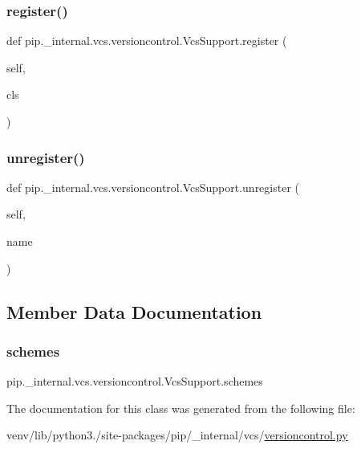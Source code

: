 \subsubsection{\texorpdfstring{register()}{register()}}
{\footnotesize\ttfamily def pip.\+\_\+internal.\+vcs.\+versioncontrol.\+Vcs\+Support.\+register (\begin{DoxyParamCaption}\item[{}]{self,  }\item[{}]{cls }\end{DoxyParamCaption})}

\mbox{\label{classpip_1_1__internal_1_1vcs_1_1versioncontrol_1_1VcsSupport_a8e93029368d6a1ec2934d98af01407cd}} 
\subsubsection{\texorpdfstring{unregister()}{unregister()}}
{\footnotesize\ttfamily def pip.\+\_\+internal.\+vcs.\+versioncontrol.\+Vcs\+Support.\+unregister (\begin{DoxyParamCaption}\item[{}]{self,  }\item[{}]{name }\end{DoxyParamCaption})}



\subsection{Member Data Documentation}
\mbox{\label{classpip_1_1__internal_1_1vcs_1_1versioncontrol_1_1VcsSupport_ae193e78e4092756691e32f6772bec171}} 
\subsubsection{\texorpdfstring{schemes}{schemes}}
{\footnotesize\ttfamily pip.\+\_\+internal.\+vcs.\+versioncontrol.\+Vcs\+Support.\+schemes\hspace{0.3cm}{\ttfamily [static]}}



The documentation for this class was generated from the following file\+:\begin{DoxyCompactItemize}
\item 
venv/lib/python3./site-\/packages/pip/\+\_\+internal/vcs/\hyperlink{versioncontrol_8py}{versioncontrol.\+py}\end{DoxyCompactItemize}
